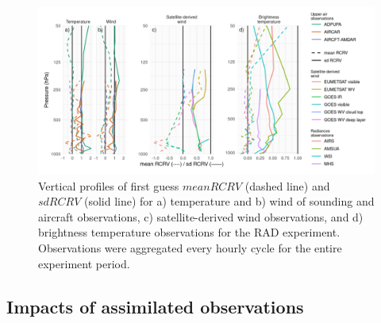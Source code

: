 \documentclass[preprint, 3p, authoryear,review, 12pt]{elsarticle} %
\begin{document}
\begin{figure}
\includegraphics{../figures/rcrv-profile-1} \caption{Vertical profiles of first guess \(mean RCRV\) (dashed line) and \(sd RCRV\) (solid line) for a) temperature and b) wind of sounding and aircraft observations, c) satellite-derived wind observations, and d) brightness temperature observations for the RAD experiment. Observations were aggregated every hourly cycle for the entire experiment period.}\label{fig:rcrv-profile}
\end{figure}

\hypertarget{impacts-of-assimilated-observations}{%
\subsection{Impacts of assimilated observations}\label{impacts-of-assimilated-observations}}
\end{document}
